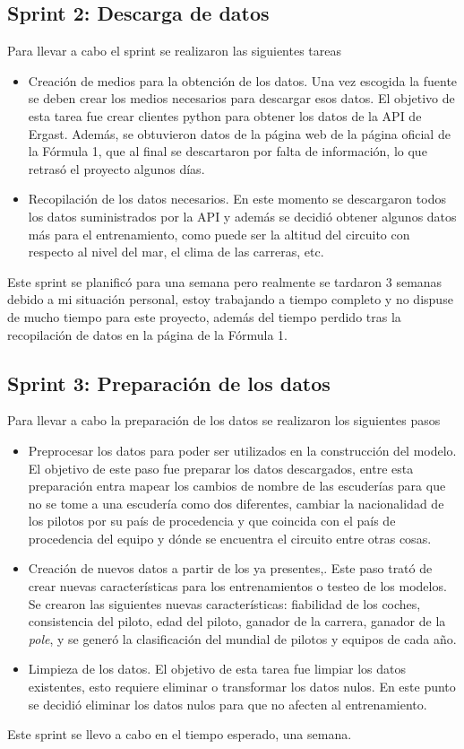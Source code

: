 \subsection{Sprint 2: Descarga de datos}
Para llevar a cabo el sprint se realizaron las siguientes tareas
\begin{itemize}
    \item 
    Creación de medios para la obtención de los datos.
    Una vez escogida la fuente se deben crear los medios necesarios para descargar esos datos. El objetivo de esta tarea fue crear clientes python para obtener los datos de la API de Ergast.
    Además, se obtuvieron datos de la página web de la página oficial de la Fórmula 1, que al final se descartaron por falta de información, lo que retrasó el proyecto algunos días. 
    \item
    Recopilación de los datos necesarios.
    En este momento se descargaron todos los datos suministrados por la API y además se decidió obtener algunos datos más para el entrenamiento, como puede ser la altitud del circuito con respecto al nivel del mar, el clima de las carreras, etc.
\end{itemize}

Este sprint se planificó para una semana pero realmente se tardaron 3 semanas debido a mi situación personal, estoy trabajando a tiempo completo y no dispuse de mucho tiempo para este proyecto, además del tiempo perdido tras la recopilación de datos en la página de la Fórmula 1.

\subsection{Sprint 3: Preparación de los datos}
Para llevar a cabo la preparación de los datos se realizaron los siguientes pasos
\begin{itemize}
    \item 
    Preprocesar los datos para poder ser utilizados en la construcción del modelo.
    El objetivo de este paso fue preparar los datos descargados, entre esta preparación entra mapear los cambios de nombre de las escuderías para que no se tome a una escudería como dos diferentes, cambiar la nacionalidad de los pilotos por su país de procedencia y que coincida con el país de procedencia del equipo y dónde se encuentra el circuito entre otras cosas.
    \item
    Creación de nuevos datos a partir de los ya presentes,.
    Este paso trató de crear nuevas características para los entrenamientos o testeo de los modelos. Se crearon las siguientes nuevas características: fiabilidad de los coches, consistencia del piloto, edad del piloto, ganador de la carrera, ganador de la \textit{pole}, y se generó la clasificación del mundial de pilotos y equipos de cada año.
    \item 
    Limpieza de los datos.
    El objetivo de esta tarea fue limpiar los datos existentes, esto requiere eliminar o transformar los datos nulos. En este punto se decidió eliminar los datos nulos para que no afecten al entrenamiento.
    
\end{itemize}
Este sprint se llevo a cabo en el tiempo esperado, una semana.


